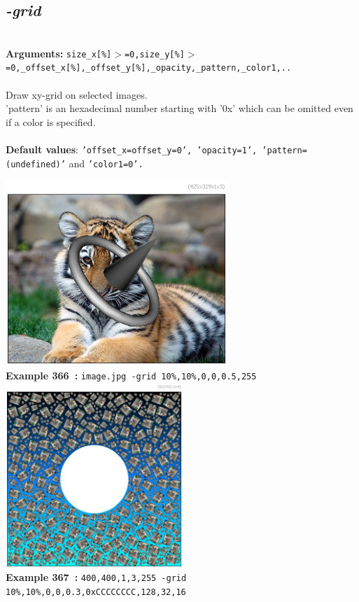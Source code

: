 \documentclass[a4paper,11pt,twoside]{book}
\begin{document}
\subsection{\emph{-grid} }\vspace*{-0.5em}
~\\\textbf{Arguments: } 
{\small \texttt{size\_x[\%]$>$=0,size\_y[\%]$>$=0,\_offset\_x[\%],\_offset\_y[\%],\_opacity,\_pattern,\_color1,..}}\\~\\
Draw xy-grid on selected images.
~\\'pattern' is an hexadecimal number starting with '0x' which can be omitted
even if a color is specified.
~\\~\\\textbf{Default values}: {\small \texttt{'offset\_x=offset\_y=0', 'opacity=1', 'pattern=(undefined)'} and \texttt{'color1=0'.}}
\begin{center}\includegraphics[keepaspectratio=true,height=7cm,width=\textwidth]{img/gmic_def366.jpg}\\
{\footnotesize \textbf{Example 366~:} \texttt{image.jpg -grid 10\%,10\%,0,0,0.5,255}}
\\\includegraphics[keepaspectratio=true,height=7cm,width=\textwidth]{img/gmic_def367.jpg}\\
{\footnotesize \textbf{Example 367~:} \texttt{400,400,1,3,255 -grid 10\%,10\%,0,0,0.3,0xCCCCCCCC,128,32,16}}
\end{center}
\end{document}
